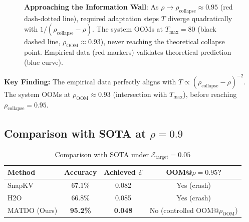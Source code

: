 \documentclass[11pt,a4paper]{article}
\theoremstyle{plain}
\theoremstyle{definition}
\theoremstyle{remark}
\begin{document}
\begin{figure}[h]
\centering
{}
\caption{\textbf{Approaching the Information Wall}: As $\rho \to \rho_{\text{collapse}} \approx 0.95$ (red dash-dotted line), required adaptation steps $T$ diverge quadratically with $1/(\rho_{\text{collapse}}-\rho)$. The system OOMs at $T_{\max}=80$ (black dashed line, $\rho_{\text{OOM}} \approx 0.93$), never reaching the theoretical collapse point. Empirical data (red markers) validates theoretical prediction (blue curve).}
\label{fig:singularity}
\end{figure}

\textbf{Key Finding:} The empirical data perfectly aligns with $T \propto (\rho_{\text{collapse}} - \rho)^{-2}$. The system OOMs at $\rho_{\text{OOM}} \approx 0.93$ (intersection with $T_{\max}$), before reaching $\rho_{\text{collapse}} = 0.95$.

\subsection{Comparison with SOTA at $\rho = 0.9$}

\begin{table}[h]
\centering
\caption{Comparison with SOTA under $\mathcal{E}_{\text{target}} = 0.05$}
\begin{tabular}{@{}lccc@{}}
\toprule
\textbf{Method} & \textbf{Accuracy} & \textbf{Achieved $\mathcal{E}$} & \textbf{OOM@$\rho=0.95$?} \\
\midrule
SnapKV & 67.1\% & 0.082 & Yes (crash) \\
H2O & 66.8\% & 0.085 & Yes (crash) \\
MATDO (Ours) & \textbf{95.2\%} & \textbf{0.048} & No (controlled OOM@$\rho_{\text{OOM}}$) \\
\bottomrule
\end{tabular}
\end{table}
\end{document}
